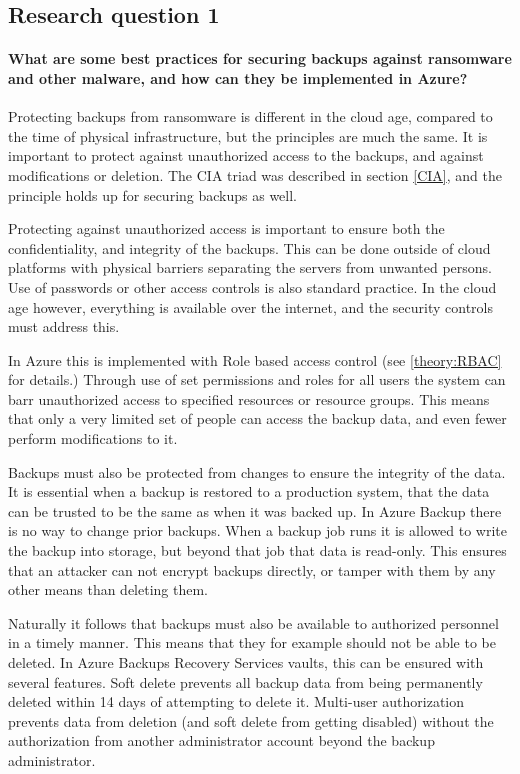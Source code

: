 \subsection{Research question 1}
\paragraph{What are some  best practices for securing backups against ransomware and other malware, and how can they be implemented in Azure?}

Protecting backups from ransomware is different in the cloud age, compared to the time of physical infrastructure, but the principles are much the same. It is important to protect against unauthorized access to the backups, and against modifications or deletion. The CIA triad was described in section \ref{CIA}, and the principle holds up for securing backups as well. 

Protecting against unauthorized access is important to ensure both the confidentiality, and integrity of the backups. This can be done outside of cloud platforms with physical barriers separating the servers from unwanted persons. Use of passwords or other access controls is also standard practice. In the cloud age however, everything is available over the internet, and the security controls must address this. 

In Azure this is implemented with Role based access control (see \ref{theory:RBAC} for details.) Through use of set permissions and roles for all users the system can barr unauthorized access to specified resources or resource groups. This means that only a very limited set of people can access the backup data, and even fewer perform modifications to it. 

Backups must also be protected from changes to ensure the integrity of the data. It is essential when a backup is restored to a production system, that the data can be trusted to be the same as when it was backed up. In Azure Backup there is no way to change prior backups. When a backup job runs it is allowed to write the backup into storage, but beyond that job that data is read-only. This ensures that an attacker can not encrypt backups directly, or tamper with them by any other means than deleting them. 

Naturally it follows that backups must also be available to authorized personnel in a timely manner. This means that they for example should not be able to be deleted. In Azure Backups Recovery Services vaults, this can be ensured with several features. Soft delete prevents all backup data from being permanently deleted within 14 days of attempting to delete it. Multi-user authorization prevents data from deletion (and soft delete from getting disabled) without the authorization from another administrator account beyond the backup administrator. 

